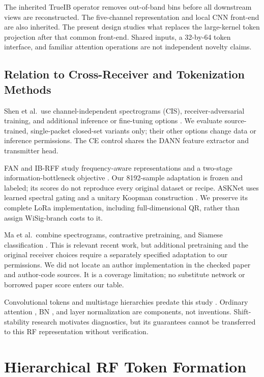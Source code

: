 \documentclass[journal]{IEEEtran}
\begin{document}
The inherited TrueIB operator removes out-of-band bins before all downstream views are reconstructed. The five-channel representation and local CNN front-end are also inherited. The present design studies what replaces the large-kernel token projection after that common front-end. Shared inputs, a 32-by-64 token interface, and familiar attention operations are not independent novelty claims.

\subsection{Relation to Cross-Receiver and Tokenization Methods}
Shen et al.\ use channel-independent spectrograms (CIS), receiver-adversarial training, and additional inference or fine-tuning options \cite{shen2024receiver}. We evaluate source-trained, single-packet closed-set variants only; their other options change data or inference permissions. The CE control shares the DANN feature extractor and transmitter head.

FAN and IB-RFF study frequency-aware representations and a two-stage information-bottleneck objective \cite{wang2026ib}. Our 8192-sample adaptation is frozen and labeled; its scores do not reproduce every original dataset or recipe. ASKNet uses learned spectral gating and a unitary Koopman construction \cite{liu2026ask}. We preserve its complete LoRa implementation, including full-dimensional QR, rather than assign WiSig-branch costs to it.

Ma et al.\ combine spectrograms, contrastive pretraining, and Siamese classification \cite{ma2025robust}. This is relevant recent work, but additional pretraining and the original receiver choices require a separately specified adaptation to our permissions. We did not locate an author implementation in the checked paper and author-code sources. It is a coverage limitation; no substitute network or borrowed paper score enters our table.

Convolutional tokens and multistage hierarchies predate this study \cite{wu2021cvt,wang2021pvt,liu2021swin}. Ordinary attention \cite{vaswani2017attention}, BN \cite{ioffe2015batch}, and layer normalization \cite{ba2016layer} are components, not inventions. Shift-stability research \cite{zhang2019shift} motivates diagnostics, but its guarantees cannot be transferred to this RF representation without verification.

\section{Hierarchical RF Token Formation}
\end{document}
